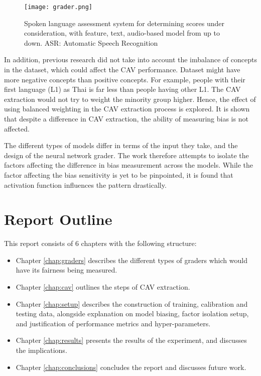 \begin{figure}[H]
    \centering
    \texttt{[image: grader.png]}
    \caption{Spoken language assessment system for determining scores under consideration, with feature, text, audio-based model from up to down. ASR: Automatic Speech Recognition}
    \label{fig:grader}
\end{figure}


In addition, previous research did not take into account the imbalance of concepts in the dataset, which could affect the CAV performance. Dataset might have more negative concepts than positive concepts. For example, people with their first language (L1)  as Thai is far less than people having other L1. The CAV extraction would not try to weight the minority group higher. Hence, the effect of using balanced weighting in the CAV extraction process is explored. It is shown that despite a difference in CAV extraction, the ability of measuring bias is not affected.

The different types of models differ in terms of the input they take, and the design of the neural network grader. The work therefore attempts to isolate the factors affecting the difference in bias measurement across the models. While the factor affecting the bias sensitivity is yet to be pinpointed, it is found that activation function influences the pattern drastically.

\section{Report Outline}
This report consists of 6 chapters with the following structure:
\begin{itemize}
    \item Chapter \ref{chap:graders} describes the different types of graders which would have its fairness being measured.
    \item Chapter \ref{chap:cav} outlines the steps of CAV extraction.
    \item Chapter \ref{chap:setup} describes the construction of training, calibration and testing data, alongside explanation on model biasing, factor isolation setup, and justification of performance metrics and hyper-parameters.
    \item Chapter \ref{chap:results} presents the results of the experiment, and discusses the implications.
    \item Chapter \ref{chap:conclusions} concludes the report and discusses future work.
\end{itemize}